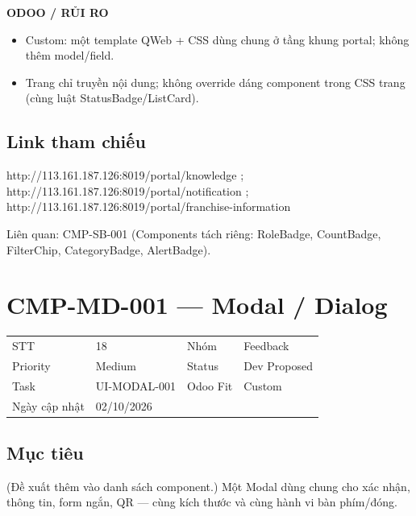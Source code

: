 \documentclass[11pt,a4paper]{report}
\begin{document}
\par\smallskip\textbf{ODOO / RỦI RO}\par
\begin{itemize}
\item Custom: một template QWeb + CSS dùng chung ở tầng khung portal; không thêm model/\allowbreak{}field.
\item Trang chỉ truyền nội dung; không override dáng component trong CSS trang (cùng luật StatusBadge/\allowbreak{}ListCard).
\end{itemize}
\subsection*{Link tham chiếu}
http://113.161.187.126:8019/\allowbreak{}portal/\allowbreak{}knowledge ; http://113.161.187.126:8019/\allowbreak{}portal/\allowbreak{}notification ; http://113.161.187.126:8019/\allowbreak{}portal/\allowbreak{}franchise-\allowbreak{}information\par
Liên quan: CMP-SB-001 (Components tách riêng: RoleBadge, CountBadge, FilterChip, CategoryBadge, AlertBadge).\par
\clearpage
\section{CMP-MD-001 --- Modal / Dialog}
\begin{tabularx}{\textwidth}{@{}l X l X@{}}\toprule
STT & 18 & Nhóm & Feedback\\
Priority & Medium & Status & Dev Proposed\\
Task & UI-MODAL-001 & Odoo Fit & Custom\\
Ngày cập nhật & 02/10/2026 & & \\\bottomrule\end{tabularx}
\subsection*{Mục tiêu}
(Đề xuất thêm vào danh sách component.) Một Modal dùng chung cho xác nhận, thông tin, form ngắn, QR — cùng kích thước và cùng hành vi bàn phím/\allowbreak{}đóng.\par
\end{document}
